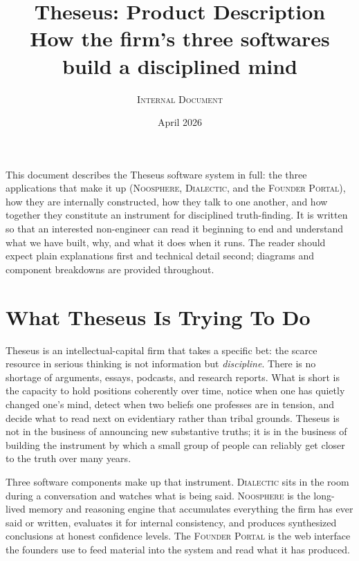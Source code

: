 \documentclass[11pt]{article}
\title{
  \vspace{-1.5cm}
  {\Huge\bfseries\color{ink} Theseus: Product Description} \\
  \vspace{0.3cm}
  {\Large\color{slate} How the firm's three softwares build a disciplined mind}
}
\author{\textsc{Internal Document}}
\date{April 2026}
\begin{document}
\maketitle
\thispagestyle{empty}

\vspace{1cm}

\begin{intuitionbox}[Orientation]
\noindent This document describes the Theseus software system in full: the three applications that make it up (\textsc{Noosphere}, \textsc{Dialectic}, and the \textsc{Founder Portal}), how they are internally constructed, how they talk to one another, and how together they constitute an instrument for disciplined truth-finding. It is written so that an interested non-engineer can read it beginning to end and understand what we have built, why, and what it does when it runs. The reader should expect plain explanations first and technical detail second; diagrams and component breakdowns are provided throughout.
\end{intuitionbox}

\tableofcontents
\clearpage

\section{What Theseus Is Trying To Do}

Theseus is an intellectual-capital firm that takes a specific bet: the scarce resource in serious thinking is not information but \emph{discipline}. There is no shortage of arguments, essays, podcasts, and research reports. What is short is the capacity to hold positions coherently over time, notice when one has quietly changed one's mind, detect when two beliefs one professes are in tension, and decide what to read next on evidentiary rather than tribal grounds. Theseus is not in the business of announcing new substantive truths; it is in the business of building the instrument by which a small group of people can reliably get closer to the truth over many years.

Three software components make up that instrument. \textsc{Dialectic} sits in the room during a conversation and watches what is being said. \textsc{Noosphere} is the long-lived memory and reasoning engine that accumulates everything the firm has ever said or written, evaluates it for internal consistency, and produces synthesized conclusions at honest confidence levels. The \textsc{Founder Portal} is the web interface the founders use to feed material into the system and read what it has produced.
\end{document}
